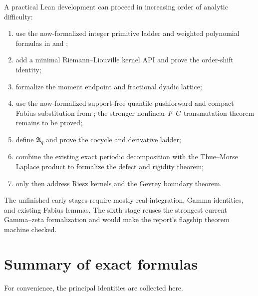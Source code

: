 \documentclass[11pt]{article}
\theoremstyle{definition}
\theoremstyle{remark}
\newcommand{\Aop}{\mathfrak A}
\begin{document}
A practical Lean development can proceed in increasing order of analytic difficulty:
\begin{enumerate}
\item[\(\checkmark\)] use the now-formalized integer primitive ladder and weighted polynomial
      formulas in  and ;
\item add a minimal Riemann--Liouville kernel API and prove the order-shift identity;
\item formalize the moment endpoint and fractional dyadic lattice;
\item[\(\checkmark\)] use the now-formalized support-free quantile pushforward and compact
      Fabius substitution from ; the stronger nonlinear
      \(F\)--\(G\) transmutation theorem remains to be proved;
\item define $\Aop_q$ and prove the cocycle and derivative ladder;
\item combine the existing exact periodic decomposition with the Thue--Morse Laplace product
      to formalize the defect and rigidity theorem;
\item only then address Riesz kernels and the Gevrey boundary theorem.
\end{enumerate}
The unfinished early stages require mostly real integration, Gamma identities, and existing
Fabius lemmas.  The sixth stage reuses the strongest current Gamma--zeta formalization and would make
the report's flagship theorem machine checked.

\section{Summary of exact formulas}
\label{sec:summary-formulas}

For convenience, the principal identities are collected here.
\end{document}
